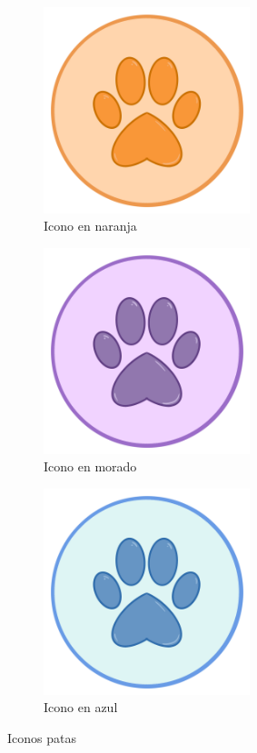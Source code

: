 \documentclass[a4paper, 12pt]{article}
\begin{document}
\begin{figure}[H]
   	\begin{subfigure}{0.48\textwidth}
		\begin{center}
			{\includegraphics[width=6cm]{Pata1.png}\par}
			\caption{Icono en naranja}
		\end{center}  
	\end{subfigure}\hfill
   	\begin{subfigure}{0.48\textwidth}
		\begin{center}
			{\includegraphics[width=6cm]{Pata2.png}\par}
			\caption{Icono en morado}
		\end{center}  
	\end{subfigure}\hfill
   	\begin{subfigure}{0.48\textwidth}
		\begin{center}
			{\includegraphics[width=6cm]{Pata3.png}\par}
			\caption{Icono en azul}
		\end{center}  
	\end{subfigure}\hfill
	\caption{Iconos patas}
\end{figure}
\end{document}
